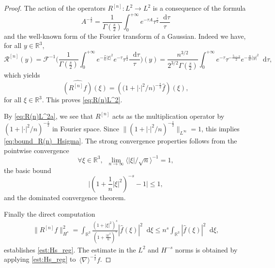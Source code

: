 \documentclass[12pt,a4paper]{amsart}
\numberwithin{equation}{section}
\newcommand*\diff{\mathop{}\!\mathrm{d}}
\begin{document}
	\begin{proof}
		The action of the operators $R^{[n]}:L^2\to L^2$ is a consequence of the formula 
		\begin{equation*}
			A^{-\frac{s}{2}} = \frac{1}{\Gamma(\frac{s}{2})} \int_{0}^{+\infty}  e^{-\tau A} \tau^{\frac{s}{2}} \frac{\diff \tau}{\tau}
		\end{equation*}
		and the %
		well-known form of the Fourier transform of a Gaussian. Indeed we have, for all $y\in\mathbb{R}^3$,
		\begin{equation*}
			\mathcal{R}^{[n]}(y) = \mathcal{F}^{-1} \Big( \frac{1}{\Gamma(\frac{s}{2})} \int_{0}^{+\infty}  e^{-\frac{\tau}{n} |\xi|^2} e^{-\tau} \tau^{\frac{s}{2}} \frac{\diff \tau}{\tau} \Big) (y) = \frac{n^{3/2}}{2^{3/2} \Gamma(\frac{s}{2})} \int_{0}^{+\infty}  e^{-\tau} \tau^{-\frac{5-s}{2}} e^{-\frac{n}{4 \tau} |y|^2} \diff \tau,
		\end{equation*}
		which yields
		\begin{equation}\label{eq:R(n)L^2a}
			\widehat{(R^{[n]}f)} (\xi) = ( \big(1 + |\cdot|^2/n \big)^{-\frac{s}{2}} \hat{f} ) (\xi), 
		\end{equation}
		for all $\xi\in\mathbb{R}^3$. This proves \eqref{eq:R(n)L^2}.
		
		
		By \eqref{eq:R(n)L^2a}, we see that $R^{[n]}$ acts as the multiplication operator by $(1 + |\cdot|^2/n )^{-\frac{s}{2}}$ in Fourier space. Since $\|(1 + |\cdot|^2/n )^{-\frac{s}{2}}\|_{L^\infty}=1$, this implies \eqref{eq:bound_R(n)_Hsigma}. The strong convergence properties follows from the pointwise convergence
		\begin{equation}
			\forall \xi \in \mathbb{R}^3, \;\ \lim_{n \rightarrow \infty} \langle  | \xi |/\sqrt{n} \rangle^{-1} = 1,
		\end{equation}
		the basic bound
		\begin{equation}
			\Bigg| (1+\frac{1}{n} | \xi |^2 )^{-s} -1 \Bigg| \leq 1 ,
		\end{equation}
		and the dominated convergence theorem.
		
		Finally the direct computation
		\begin{align}
			\| R^{[n]} f \|_{H^{s}}^2 = \int_{\mathbb{R}^3}  \frac{(1 + | \xi |^2)^s}{(1 + \frac{| \xi|^2}{n})^s} | \hat{f} (\xi) |^2 \diff \xi \leq n^s \int_{\mathbb{R}^3}  | \hat{f} (\xi) |^2 \diff \xi,
		\end{align}
		establishes \eqref{est:Hs_reg}. The estimate in the $L^2$ and $H^{-s} $ norms is obtained by applying \eqref{est:Hs_reg} to~$ \langle \nabla \rangle^{-\frac{s}{2}} f $.
	\end{proof}
	
\end{document}

